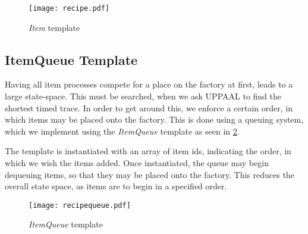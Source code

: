 \begin{figure}[H]
	\centering
	\texttt{[image: recipe.pdf]}
	\caption{\textit{Item} template}
	\label{fig:recipe}
\end{figure}

\subsection{ItemQueue Template}\label{subs:recipequeue}

Having all item processes compete for a place on the factory at first, leads to a large state-space. This must be searched, when we ask UPPAAL to find the shortest timed trace. In order to get around this, we enforce a certain order, in which items may be placed onto the factory. This is done using a queuing system, which we implement using the \emph{ItemQueue} template as seen in \cref{fig:recipequeue}.

The template is instantiated with an array of item ids, indicating the order, in which we wish the items added. Once instantiated, the queue may begin dequeuing items, so that they may be placed onto the factory. This reduces the overall state space, as items are to begin in a specified order. 

\begin{figure}[H]
\centering
\texttt{[image: recipequeue.pdf]}
\caption{\textit{ItemQueue} template}
\label{fig:recipequeue}
\end{figure}
